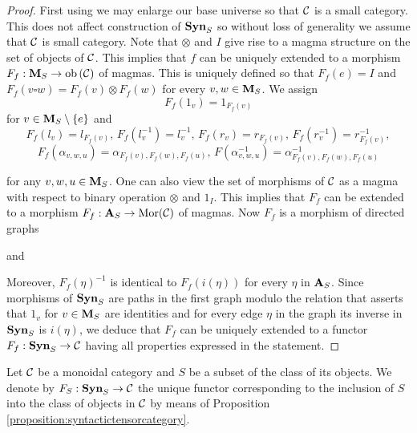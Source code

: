 \begin{proof}
First using {\cite[Introduction]{Presheaves}} we may enlarge our base universe so that ${\mathcal C}$ is a small category. This does not affect construction of $\mathbf{Syn}_S$ so without loss of generality we assume that ${\mathcal C}$ is small category. Note that $\otimes$ and $I$ give rise to a magma structure on the set of objects of ${\mathcal C}$. This implies that $f$ can be uniquely extended to a morphism $F_f:\mathbf{M}_S\rightarrow \mathrm{ob}\left({\mathcal C}\right)$ of magmas. This is uniquely defined so that $F_f(e) = I$ and $F_f(v\square w) = F_f(v)\otimes F_f(w)$ for every $v, w\in \mathbf{M}_S$. We assign
$$F_f(1_v)= 1_{F_f(v)}$$
for $v\in \mathbf{M}_S\setminus \{e\}$ and
$$F_f(l_v) = l_{F_f(v)},\,F_f(l_v^{-1})=l^{-1}_v,\,F_f(r_v) = r_{F_f(v)},\,F_f(r^{-1}_v)=r^{-1}_{F_f(v)},$$
$$F_f(\alpha_{v,w,u}) = \alpha_{F_f(v),F_f(w),F_f(u)},\,F(\alpha^{-1}_{v,w,u})=\alpha^{-1}_{F_f(v),F_f(w),F_f(u)}$$

for any $v,w,u\in \mathbf{M}_S$. One can also view the set of morphisms of ${\mathcal C}$ as a magma with respect to binary operation $\otimes$ and $1_I$. This implies that $F_f$ can be extended to a morphism $F_f:\mathbf{A}_S\rightarrow \mathrm{Mor}({\mathcal C})$ of magmas. Now $F_f$ is a morphism of directed graphs
\begin{center}
\end{center}
and
\begin{center}
\end{center}
Moreover, $F_f(\eta)^{-1}$ is identical to $F_f(i(\eta))$ for every $\eta$ in $\mathbf{A}_S$. Since morphisms of $\mathbf{Syn}_S$ are paths in the first graph modulo the relation that asserts that $1_v$ for $v\in \mathbf{M}_S$ are identities and for every edge $\eta$ in the graph its inverse in $\mathbf{Syn}_S$ is $i(\eta)$, we deduce that $F_f$ can be uniquely extended to a functor $F_f:\mathbf{Syn}_S\rightarrow {\mathcal C}$ having all properties expressed in the statement.
\end{proof}
\noindent
Let ${\mathcal C}$ be a monoidal category and $S$ be a subset of the class of its objects. We denote by $F_S:\mathbf{Syn}_S\rightarrow {\mathcal C}$ the unique functor corresponding to the inclusion of $S$ into the class of objects in ${\mathcal C}$ by means of Proposition \ref{proposition:syntactictensorcategory}.


